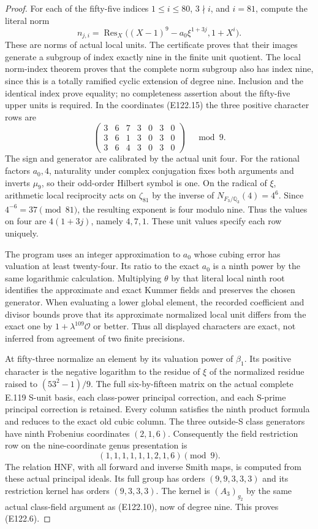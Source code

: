 \begin{proof}
For each of the fifty-five indices
$1\le i\le80$, $3\nmid i$, and $i=81$, compute the literal norm
\[
 n_{j,i}=\operatorname{Res}_X
       \bigl((X-1)^9-a_0\xi^{1+3j},1+X^i\bigr).
 \tag{E122.16}
\]
These are norms of actual local units. The certificate proves that
their images generate a subgroup of index exactly nine in the
finite unit quotient. The local norm-index theorem proves that
the complete norm subgroup also has index nine, since this is a
totally ramified cyclic extension of degree nine. Inclusion and
the identical index prove equality; no completeness assertion about
the fifty-five upper units is required.
In the coordinates (E122.15) the three positive character rows are
\[
 \begin{pmatrix}
 3&6&7&3&0&3&0\\
 3&6&1&3&0&3&0\\
 3&6&4&3&0&3&0
 \end{pmatrix}\quad\bmod9.
 \tag{E122.17}
\]
The sign and generator are calibrated by the actual unit four.
For the rational factors $a_0,4$, naturality under complex conjugation
fixes both arguments and inverts $\mu_9$, so their odd-order Hilbert
symbol is one. On the radical of $\xi$, arithmetic local reciprocity
acts on $\zeta_{81}$ by the inverse of $N_{F_3/\mathbb Q_3}(4)=4^6$.
Since $4^{-6}=37\pmod{81}$, the resulting exponent is four
modulo nine. Thus the values on four are $4(1+3j)$, namely
$4,7,1$. These unit values specify each row uniquely.

The program uses an integer approximation to $a_0$ whose cubing
error has valuation at least twenty-four. Its ratio to the exact
$a_0$ is a ninth power by the same logarithmic calculation.
Multiplying $\theta$ by that literal local ninth root identifies
the approximate and exact Kummer fields and preserves the chosen
generator. When evaluating a lower global element, the recorded
coefficient and divisor bounds prove that its approximate normalized
local unit differs from the exact one by $1+\lambda^{109}\mathcal O$
or better. Thus all displayed characters are exact, not inferred
from agreement of two finite precisions.

At fifty-three normalize an element by its valuation power of
$\beta_1$. Its positive character is the negative logarithm to
the residue of $\xi$ of the normalized residue raised to
$(53^2-1)/9$. The full six-by-fifteen matrix on the actual complete
E.119 S-unit basis, each class-power principal correction, and each
S-prime principal correction is retained. Every column satisfies
the ninth product formula and reduces to the exact old cubic
column. The three outside-S class generators have ninth Frobenius
coordinates $(2,1,6)$. Consequently the field restriction row on
the nine-coordinate genus presentation is
\[
                  (1,1,1,1,1,1,2,1,6)\pmod9.
 \tag{E122.18}
\]
The relation HNF, with all forward and inverse Smith maps, is
computed from these actual principal ideals. Its full group has
orders $(9,9,3,3,3)$ and its restriction kernel has orders
$(9,3,3,3)$. The kernel is $(A_3)_{g_2}$ by the same actual
class-field argument as (E122.10), now of degree nine. This proves
(E122.6).


\end{proof}
